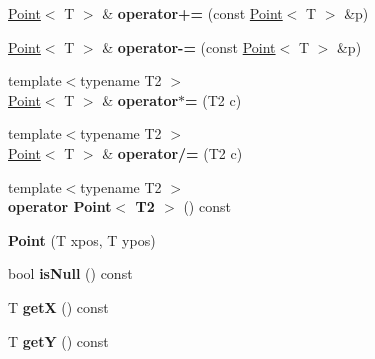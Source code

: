 \begin{DoxyCompactItemize}
\item 
\hypertarget{class_point_a2c82fe84181ba81c0cb13f42b2e5f8f6}{
\hyperlink{class_point}{Point}$<$ T $>$ \& {\bfseries operator+=} (const \hyperlink{class_point}{Point}$<$ T $>$ \&p)}
\label{class_point_a2c82fe84181ba81c0cb13f42b2e5f8f6}

\item 
\hypertarget{class_point_a97420680779305d8ff418154432d18e6}{
\hyperlink{class_point}{Point}$<$ T $>$ \& {\bfseries operator-\/=} (const \hyperlink{class_point}{Point}$<$ T $>$ \&p)}
\label{class_point_a97420680779305d8ff418154432d18e6}

\item 
\hypertarget{class_point_af661fc31fd0d5e68272dd0b5fd89c098}{
{\footnotesize template$<$typename T2 $>$ }\\\hyperlink{class_point}{Point}$<$ T $>$ \& {\bfseries operator$\ast$=} (T2 c)}
\label{class_point_af661fc31fd0d5e68272dd0b5fd89c098}

\item 
\hypertarget{class_point_a1eea2586fd60dc3afd91fa48a2243d34}{
{\footnotesize template$<$typename T2 $>$ }\\\hyperlink{class_point}{Point}$<$ T $>$ \& {\bfseries operator/=} (T2 c)}
\label{class_point_a1eea2586fd60dc3afd91fa48a2243d34}

\item 
\hypertarget{class_point_ae81e26af57b63fc89ed704b1035cf149}{
{\footnotesize template$<$typename T2 $>$ }\\{\bfseries operator Point$<$ T2 $>$} () const }
\label{class_point_ae81e26af57b63fc89ed704b1035cf149}

\item 
\hypertarget{class_point_afee21757359d199f4c69d9701e1dc7e2}{
{\bfseries Point} (T xpos, T ypos)}
\label{class_point_afee21757359d199f4c69d9701e1dc7e2}

\item 
\hypertarget{class_point_ac9b271484c83c7e1d9a6f07ab11f3f68}{
bool {\bfseries isNull} () const }
\label{class_point_ac9b271484c83c7e1d9a6f07ab11f3f68}

\item 
\hypertarget{class_point_ae414e3bdd4f00190e7c4a999e9020f6c}{
T {\bfseries getX} () const }
\label{class_point_ae414e3bdd4f00190e7c4a999e9020f6c}

\item 
\hypertarget{class_point_a6b5641f2ef6c44b88f14276150dce919}{
T {\bfseries getY} () const }
\label{class_point_a6b5641f2ef6c44b88f14276150dce919}


\end{DoxyCompactItemize}
